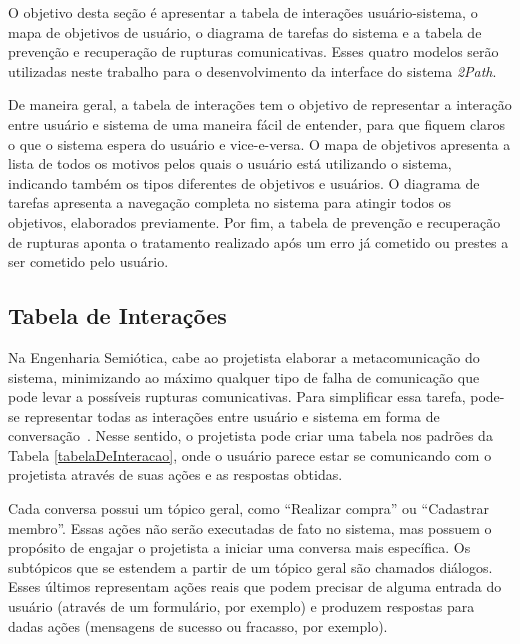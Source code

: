 \indent O objetivo desta seção é apresentar a tabela de interações usuário-sistema, o mapa de objetivos de usuário, o diagrama de tarefas do sistema e a tabela de prevenção e recuperação de rupturas comunicativas. Esses quatro modelos serão utilizadas neste trabalho para o desenvolvimento da interface do sistema \textit{2Path}. 

\indent De maneira geral, a tabela de interações tem o objetivo de representar a interação entre usuário e sistema de uma maneira fácil de entender, para que fiquem claros o que o sistema espera do usuário e vice-e-versa. O mapa de objetivos apresenta a lista de todos os motivos pelos quais o usuário está utilizando o sistema, indicando também os tipos diferentes de objetivos e usuários. O diagrama de tarefas apresenta a navegação completa no sistema para atingir todos os objetivos, elaborados previamente. Por fim, a tabela de prevenção e recuperação de rupturas aponta o tratamento realizado após um erro já cometido ou prestes a ser cometido pelo usuário.

\subsection{Tabela de Interações}

\indent Na Engenharia Semiótica, cabe ao projetista elaborar a metacomunicação do sistema, minimizando ao máximo qualquer tipo de falha de comunicação que pode levar a possíveis rupturas comunicativas. Para simplificar essa tarefa, pode-se representar todas as interações entre usuário e sistema em forma de conversação~\cite{IHCbook}. Nesse sentido, o projetista pode criar uma tabela nos padrões da Tabela \ref{tabelaDeInteracao}, onde o usuário parece estar se comunicando com o projetista através de suas ações e as respostas obtidas.

\indent Cada conversa possui um tópico geral, como ``Realizar compra'' ou ``Cadastrar membro''. Essas ações não serão executadas de fato no sistema, mas possuem o propósito de engajar o projetista a iniciar uma conversa mais específica. Os subtópicos que se estendem a partir de um tópico geral são chamados diálogos. Esses últimos representam ações reais que podem precisar de alguma entrada do usuário (através de um formulário, por exemplo) e produzem respostas para dadas ações (mensagens de sucesso ou fracasso, por exemplo).

